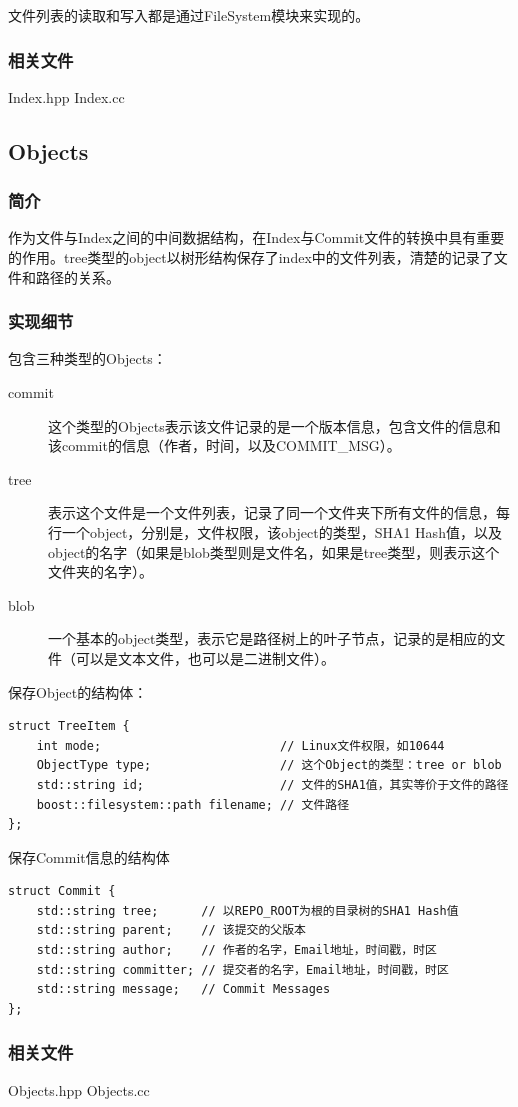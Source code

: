 \documentclass[11pt, a4paper, UTF8]{ctexart}
\begin{document}
文件列表的读取和写入都是通过FileSystem模块来实现的。
\subsubsection{相关文件}
Index.hpp Index.cc

\subsection{Objects}
\subsubsection{简介}
作为文件与Index之间的中间数据结构，在Index与Commit文件的转换中具有重要的作用。tree类型的object以树形结构保存了index中的文件列表，清楚的记录了文件和路径的关系。
\subsubsection{实现细节}
包含三种类型的Objects：
\begin{description}
	\item[commit] 这个类型的Objects表示该文件记录的是一个版本信息，包含文件的信息和该commit的信息（作者，时间，以及COMMIT\_MSG）。
	\item[tree] 表示这个文件是一个文件列表，记录了同一个文件夹下所有文件的信息，每行一个object，分别是，文件权限，该object的类型，SHA1 Hash值，以及object的名字（如果是blob类型则是文件名，如果是tree类型，则表示这个文件夹的名字）。
	\item[blob] 一个基本的object类型，表示它是路径树上的叶子节点，记录的是相应的文件（可以是文本文件，也可以是二进制文件）。
\end{description}
保存Object的结构体：
\begin{lstlisting}
struct TreeItem {
	int mode;                         // Linux文件权限，如10644
	ObjectType type;                  // 这个Object的类型：tree or blob
	std::string id;                   // 文件的SHA1值，其实等价于文件的路径
	boost::filesystem::path filename; // 文件路径
};
\end{lstlisting}
保存Commit信息的结构体
\begin{lstlisting}
struct Commit {
	std::string tree;      // 以REPO_ROOT为根的目录树的SHA1 Hash值
	std::string parent;    // 该提交的父版本
	std::string author;    // 作者的名字，Email地址，时间戳，时区
	std::string committer; // 提交者的名字，Email地址，时间戳，时区
	std::string message;   // Commit Messages
};
\end{lstlisting}
\subsubsection{相关文件}
Objects.hpp Objects.cc
\end{document}
